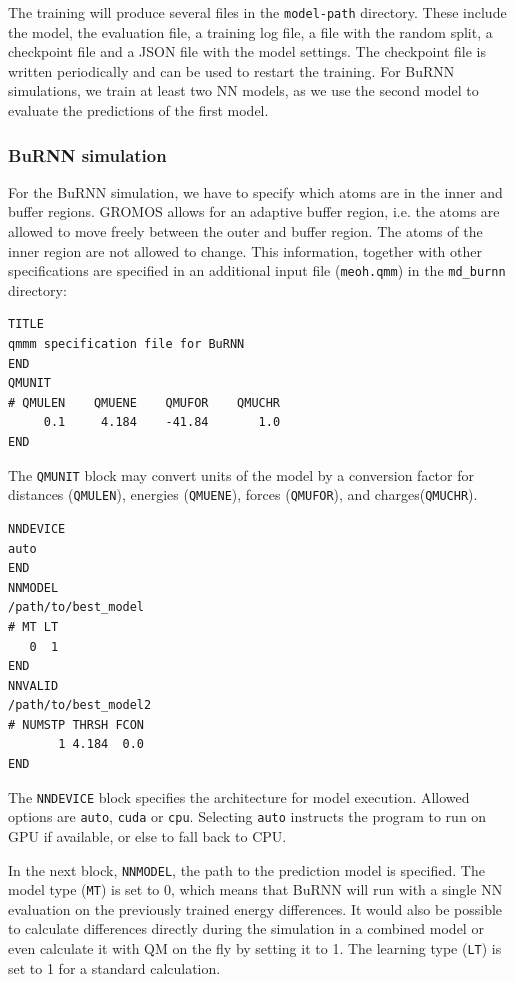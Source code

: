 The training will produce several files in the \texttt{model-path} directory. These include the model, the evaluation file, a training log file, a file with the random split, a checkpoint file and a JSON file with the model settings. The checkpoint file is written periodically and can be used to restart the training. For BuRNN simulations, we train at least two NN models, as we use the second model to evaluate the predictions of the first model.



\subsubsection{BuRNN simulation}

For the BuRNN simulation, we have to specify which atoms are in the inner and buffer regions. GROMOS allows for an adaptive buffer region, i.e. the atoms are allowed to move freely between the outer and buffer region. The atoms of the inner region are not allowed to change. This information, together with other specifications are specified in an additional input file (\texttt{meoh.qmm}) in the \texttt{md\_burnn} directory:

\begin{lstlisting}[breaklines=true, breakatwhitespace=false]
TITLE
qmmm specification file for BuRNN  
END
QMUNIT
# QMULEN    QMUENE    QMUFOR    QMUCHR
     0.1     4.184    -41.84       1.0
END
\end{lstlisting}

The \texttt{QMUNIT} block may convert units of the model by a conversion factor for distances (\texttt{QMULEN}), energies (\texttt{QMUENE}), forces (\texttt{QMUFOR}), and charges(\texttt{QMUCHR}).

\begin{lstlisting}[breaklines=true, breakatwhitespace=false]
NNDEVICE
auto
END
NNMODEL
/path/to/best_model
# MT LT
   0  1
END
NNVALID
/path/to/best_model2
# NUMSTP THRSH FCON 
       1 4.184  0.0
END
\end{lstlisting}


The \texttt{NNDEVICE} block specifies the architecture for model execution. Allowed options are \texttt{auto}, \texttt{cuda} or \texttt{cpu}. Selecting \texttt{auto} instructs the program to run on GPU if available, or else to fall back to CPU.

In the next block, \texttt{NNMODEL}, the path to the prediction model is specified. The model type (\texttt{MT}) is set to 0, which means that BuRNN will run with a single NN evaluation on the previously trained energy differences. It would also be possible to calculate differences directly during the simulation in a combined model or even calculate it with QM on the fly by setting it to 1. The learning type (\texttt{LT}) is set to 1 for a standard calculation. 

